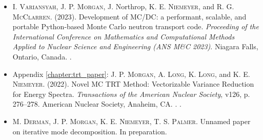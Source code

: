 \begin{itemize}
    \item \textsc{I. Variansyah}, \textsc{J. P. Morgan}, {J. Northrop}, \textsc{K. E. Niemeyer}, and \textsc{R. G. McClarren}. (2023). Development of MC/DC: a performant, scalable, and portable Python-based Monte Carlo neutron transport code. \emph{Proceeding of the International Conference on Mathematics and Computational Methods Applied to Nuclear Science and Engineering (ANS M\&C 2023)}. Niagara Falls, Ontario, Canada. .

    \item Appendix \ref{chapter:trt_paper}: \textsc{J. P. Morgan}, \textsc{A. Long}, \textsc{K. Long}, and \textsc{K. E. Niemeyer}. (2022). Novel MC TRT Method: Vectorizable Variance Reduction for Energy Spectra. \emph{Transactions of the American Nuclear Society}, v126, p. 276--278. American Nuclear Society, Anaheim, CA. . .

    \item \textsc{M. Derman}, \textsc{J. P. Morgan}, \textsc{K. E. Niemeyer}, \textsc{T. S. Palmer}. Unnamed paper on iterative mode decomposition. In preparation.
\end{itemize}